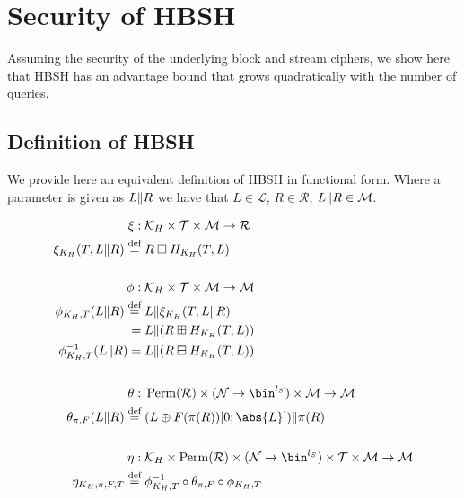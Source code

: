 \documentclass[eprint.tex]{subfiles}
\begin{document}
\section{Security of HBSH}
Assuming the security of the underlying block and stream ciphers,
we show here that HBSH has an
advantage bound that grows quadratically with the number of queries.
\subsection{Definition of HBSH}\label{funcdef}
We provide here an
equivalent definition of HBSH in functional form.
Where a parameter is given as $L \Vert R$ we have that
$L \in \mathcal{L}$, $R \in \mathcal{R}$, $L \Vert R \in \mathcal{M}$.

\begin{align*}
    \xi :{}& \mathcal{K}_H \times \mathcal{T} \times \mathcal{M} \rightarrow \mathcal{R} \\
    \xi_{K_H}(T, L \Concat R) \defeq{}& R \boxplus H_{K_H}(T, L) \\
    \allowdisplaybreaks[4] \vphantom{|} \\ \allowdisplaybreaks[0]
    \phi :{}& \mathcal{K}_H \times \mathcal{T} \times \mathcal{M} \rightarrow \mathcal{M} \\
    \phi_{K_H, T}(L \Concat R) \defeq{}& L \Concat \xi_{K_H}(T, L \Concat R) \\
    ={}& L \Concat (R \boxplus H_{K_H}(T, L)) \\
    \phi^{-1}_{K_H, T}(L \Concat R) ={}& L \Concat (R \boxminus H_{K_H}(T, L)) \\
    \allowdisplaybreaks[4] \vphantom{|} \\ \allowdisplaybreaks[0]
    \theta :{}& \Perm(\mathcal{R}) \times (\mathcal{N} \rightarrow \bin^{l_S}) \times \mathcal{M} \rightarrow \mathcal{M} \\
    \theta_{\pi, F}(L \Concat R) \defeq{}& (L \oplus F(\pi(R))[0;\abs{L}]) \Concat \pi(R) \\
    \allowdisplaybreaks[4] \vphantom{|} \\ \allowdisplaybreaks[0]
    \eta :{}& \mathcal{K}_H \times \Perm(\mathcal{R}) \times (\mathcal{N} \rightarrow \bin^{l_S}) \times \mathcal{T} \times \mathcal{M} \rightarrow \mathcal{M} \\
    \eta_{K_H, \pi, F, T} \defeq{}& \phi_{K_H,T}^{-1} \circ \theta_{\pi, F} \circ \phi_{K_H,T} \\
    \allowdisplaybreaks[4] \vphantom{|} \\ \allowdisplaybreaks[0]

\end{align*}
\end{document}
